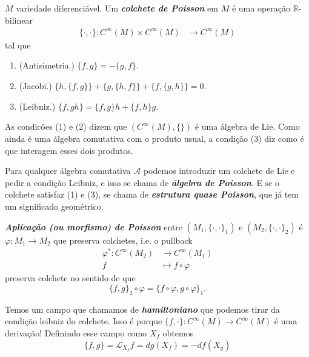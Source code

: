 \begin{defn}\leavevmode
\(M\) variedade diferenciável. Um \textit{\textbf{colchete de Poisson}} em \(M\) é uma operação \(\mathbb{R}\)-bilinear
\begin{align*}
	\{\cdot ,\cdot \}: C^\infty(M)\times C^\infty(M) &\longrightarrow C^\infty(M)
\end{align*}
tal que
\begin{enumerate}
\item (Antisimetria.) \(\{f,g\}=-\{g,f\}\).
\item (Jacobi.) \(\{h,\{f,g\}\} +\{g,\{h,f\}\} +\{f,\{g,h\}\} =0\).
 \item (Leibniz.) \(\{f,gh\}=\{f,g\}h+\{f,h\}g\).
\end{enumerate}
\end{defn}
\begin{remark}\leavevmode
As condicões (1) e (2) dizem que  \((C^\infty(M),\{\})\) é uma álgebra de Lie. Como ainda é uma álgebra comutativa com o produto usual, a condição (3) diz como é que interagem esses dois produtos.
\end{remark}
\begin{remark}\leavevmode
Para qualquer álgebra comutativa \(\mathcal{A}\) podemos introduzir um colchete de Lie e pedir a condição Leibniz, e isso se chama de \textit{\textbf{álgebra de Poisson}}. E se o colchete satisfaz (1) e (3), se chama de \textit{\textbf{estrutura quase Poisson}}, que já tem um significado geométrico.
\end{remark}
\begin{defn}\leavevmode
\textit{\textbf{Aplicação (ou morfismo) de Poisson}} entre \((M_1,\{\cdot ,\cdot \}_1)\) e \((M_2,\{ \cdot ,\cdot \}_2)\) é \(\varphi:M_1 \to M_2\) que preserva colchetes, i.e. o pullback
\begin{align*}
	\varphi^*: C^\infty(M_2) &\longrightarrow C^\infty(M_1) \\
	f &\longmapsto f \circ \varphi
\end{align*}
preserva colchete no sentido de que
\[\{f,g\}_2 \circ \varphi=\{f \circ \varphi,g \circ \varphi\}_1.\]
\end{defn}
Temos um campo que chamamos de \textit{\textbf{hamiltoniano}} que podemos tirar da condição leibniz do colchete. Isso é porque \(\{f,\cdot \}:C^\infty(M) \to C^\infty(M)\) é uma derivação! Definindo esse campo como \(X_f\) obtemos
\[\{f,g\}=\mathcal{L}_{X_f}f=dg(X_f)=-df(X_g)\]

